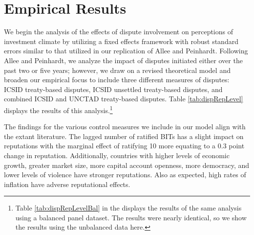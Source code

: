 \documentclass[12pt,onesided]{amsart}
\begin{document}
\section*{Empirical Results}

We begin the analysis of the effects of dispute involvement on perceptions of investment climate by utilizing a fixed effects framework with robust standard errors similar to that utilized in our replication of Allee and Peinhardt. Following Allee and Peinhardt, we analyze the impact of disputes initiated either over the past two or five years; however, we draw on a revised theoretical model and broaden our empirical focus to include three different measures of disputes: ICSID treaty-based disputes, ICSID unsettled treaty-based disputes, and combined ICSID and UNCTAD treaty-based disputes. Table \ref{tab:dispRepLevel} displays the results of this analysis.\footnote{Table \ref{tab:dispRepLevelBal} in the  displays the results of the same analysis using a balanced panel dataset. The results were nearly identical, so we show the results using the unbalanced data here.}

The findings for the various control measures we include in our model align with the extant literature. The lagged number of ratified BITs has a slight impact on reputations with the marginal effect of ratifying 10 more equating to a 0.3 point change in reputation. Additionally, countries with higher levels of economic growth, greater market size, more capital account openness, more democracy, and lower levels of violence have stronger reputations. Also as expected, high rates of inflation have adverse reputational effects.

\end{document}
